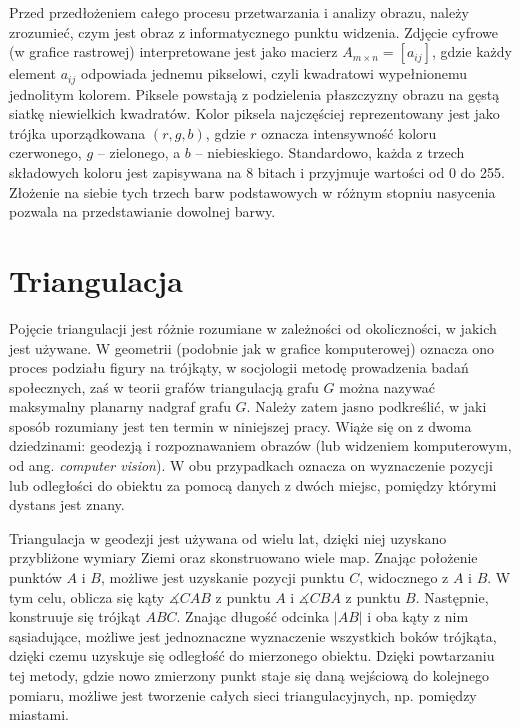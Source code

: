 Przed przedłożeniem całego procesu przetwarzania i analizy obrazu, należy zrozumieć, czym jest obraz z informatycznego punktu widzenia. Zdjęcie cyfrowe (w grafice rastrowej) interpretowane jest jako macierz $A_{m \times n} = [a_{ij}]$, gdzie każdy element $a_{ij}$ odpowiada jednemu pikselowi, czyli kwadratowi wypełnionemu jednolitym kolorem. Piksele powstają z podzielenia płaszczyzny obrazu na gęstą siatkę niewielkich kwadratów. Kolor piksela najczęściej reprezentowany jest jako trójka uporządkowana $(r, g, b)$, gdzie $r$ oznacza intensywność koloru czerwonego, $g$ -- zielonego, a $b$ -- niebieskiego. Standardowo, każda z trzech składowych koloru jest zapisywana na 8 bitach i przyjmuje wartości od 0 do 255. Złożenie na siebie tych trzech barw podstawowych w różnym stopniu nasycenia pozwala na przedstawianie dowolnej barwy.

\section{Triangulacja}
Pojęcie triangulacji jest różnie rozumiane w zależności od okoliczności, w jakich jest używane. W geometrii (podobnie jak w grafice komputerowej) oznacza ono proces podziału figury na trójkąty, w socjologii metodę prowadzenia badań społecznych, zaś w teorii grafów triangulacją grafu $G$ można nazywać maksymalny planarny nadgraf grafu $G$. Należy zatem jasno podkreślić, w jaki sposób rozumiany jest ten termin w niniejszej pracy. Wiąże się on z dwoma dziedzinami: geodezją i rozpoznawaniem obrazów (lub widzeniem komputerowym, od ang. \textit{computer vision}). W obu przypadkach oznacza on wyznaczenie pozycji lub odległości do obiektu za pomocą danych z dwóch miejsc, pomiędzy którymi dystans jest znany.

Triangulacja w geodezji jest używana od wielu lat, dzięki niej uzyskano przybliżone wymiary Ziemi oraz skonstruowano wiele map.
Znając położenie punktów $A$ i $B$, możliwe jest uzyskanie pozycji punktu $C$, widocznego z $A$ i $B$. W tym celu, oblicza się kąty $\measuredangle CAB$ z punktu $A$ i $\measuredangle CBA$ z punktu $B$. Następnie, konstruuje się trójkąt $ABC$. Znając długość odcinka $|AB|$ i oba kąty z nim sąsiadujące, możliwe jest jednoznaczne wyznaczenie wszystkich boków trójkąta, dzięki czemu uzyskuje się odległość do mierzonego obiektu. Dzięki powtarzaniu tej metody, gdzie nowo zmierzony punkt staje się daną wejściową do kolejnego pomiaru, możliwe jest tworzenie całych sieci triangulacyjnych, np. pomiędzy miastami.

